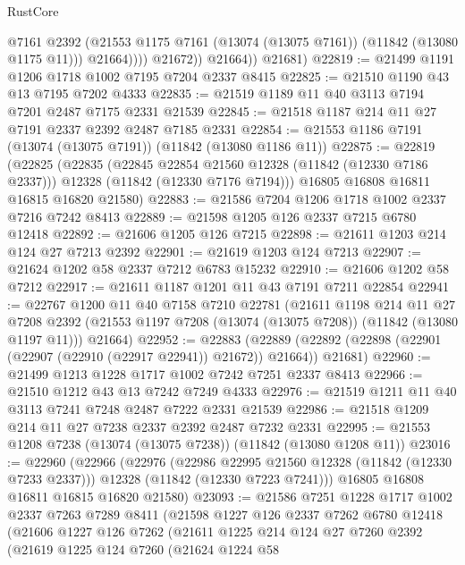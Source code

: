 \begin{lexlean}{RustCore}
\begin{coremodule}
                      @7161
                      @2392
                      (@21553 @1175 @7161 (@13074 (@13075 @7161)) (@11842 (@13080 @1175 @11)))
                      @21664))))
              @21672))
          @21664))
      @21681)
@22819 := @21499 @1191 @1206 @1718 @1002 @7195 @7204 @2337 @8415
@22825 := @21510 @1190 @43 @13 @7195 @7202 @4333
@22835 := @21519 @1189 @11 @40 @3113 @7194 @7201 @2487 @7175 @2331 @21539
@22845 := @21518 @1187 @214 @11 @27 @7191 @2337 @2392 @2487 @7185 @2331
@22854 := @21553 @1186 @7191 (@13074 (@13075 @7191)) (@11842 (@13080 @1186 @11))
@22875 := @22819
    (@22825
      (@22835
        (@22845 @22854 @21560 @12328 (@11842 (@12330 @7186 @2337)))
        @12328
        (@11842 (@12330 @7176 @7194)))
      @16805
      @16808
      @16811
      @16815
      @16820
      @21580)
@22883 := @21586 @7204 @1206 @1718 @1002 @2337 @7216 @7242 @8413
@22889 := @21598 @1205 @126 @2337 @7215 @6780 @12418
@22892 := @21606 @1205 @126 @7215
@22898 := @21611 @1203 @214 @124 @27 @7213 @2392
@22901 := @21619 @1203 @124 @7213
@22907 := @21624 @1202 @58 @2337 @7212 @6783 @15232
@22910 := @21606 @1202 @58 @7212
@22917 := @21611 @1187 @1201 @11 @43 @7191 @7211 @22854
@22941 := @22767
    @1200
    @11
    @40
    @7158
    @7210
    @22781
    (@21611
      @1198
      @214
      @11
      @27
      @7208
      @2392
      (@21553 @1197 @7208 (@13074 (@13075 @7208)) (@11842 (@13080 @1197 @11)))
      @21664)
@22952 := @22883
    (@22889 (@22892 (@22898 (@22901 (@22907 (@22910 (@22917 @22941)) @21672)) @21664)) @21681)
@22960 := @21499 @1213 @1228 @1717 @1002 @7242 @7251 @2337 @8413
@22966 := @21510 @1212 @43 @13 @7242 @7249 @4333
@22976 := @21519 @1211 @11 @40 @3113 @7241 @7248 @2487 @7222 @2331 @21539
@22986 := @21518 @1209 @214 @11 @27 @7238 @2337 @2392 @2487 @7232 @2331
@22995 := @21553 @1208 @7238 (@13074 (@13075 @7238)) (@11842 (@13080 @1208 @11))
@23016 := @22960
    (@22966
      (@22976
        (@22986 @22995 @21560 @12328 (@11842 (@12330 @7233 @2337)))
        @12328
        (@11842 (@12330 @7223 @7241)))
      @16805
      @16808
      @16811
      @16815
      @16820
      @21580)
@23093 := @21586
    @7251
    @1228
    @1717
    @1002
    @2337
    @7263
    @7289
    @8411
    (@21598
      @1227
      @126
      @2337
      @7262
      @6780
      @12418
      (@21606
        @1227
        @126
        @7262
        (@21611
          @1225
          @214
          @124
          @27
          @7260
          @2392
          (@21619
            @1225
            @124
            @7260
            (@21624
              @1224
              @58

\end{coremodule}
\end{lexlean}
